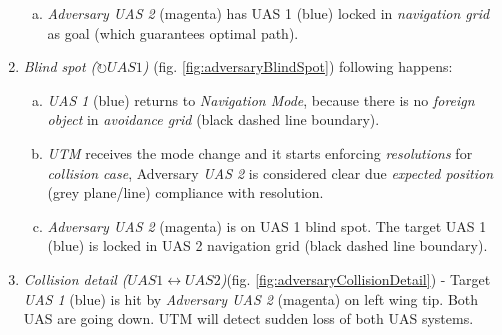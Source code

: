 \begin{enumerate}
\begin{enumerate}[a.]
        \item \emph{Adversary UAS 2} (magenta) has UAS 1 (blue) locked in \emph{navigation grid} as goal (which guarantees optimal path).
    \end{enumerate}
    
    \item \emph{Blind spot ($\circlearrowright UAS 1$)} (fig. \ref{fig:adversaryBlindSpot}) following happens:
    \begin{enumerate}[a.]
        \item \emph{UAS 1} (blue) returns to \emph{Navigation Mode}, because there is no \emph{foreign object} in \emph{avoidance grid} (black dashed line boundary).
        
        \item \emph{UTM} receives the mode change and it starts enforcing \emph{resolutions} for \emph{collision case}, Adversary \emph{UAS 2} is considered clear due \emph{expected position} (grey plane/line) compliance with resolution.
        
        \item \emph{Adversary UAS 2} (magenta) is on UAS 1 blind spot. The target UAS 1 (blue) is locked in UAS 2 navigation grid (black dashed line boundary).
    \end{enumerate}
    
    \item \emph{Collision detail ($UAS1\leftrightarrow UAS2$)}(fig. \ref{fig:adversaryCollisionDetail}) - Target \emph{UAS 1} (blue) is hit by \emph{Adversary UAS 2} (magenta) on left wing tip. Both UAS are going down. UTM will detect sudden loss of both UAS systems. 
\end{enumerate}

